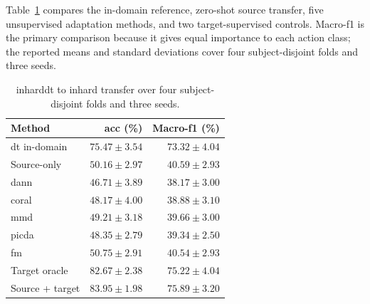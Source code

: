 \documentclass[3p,times,procedia]{elsarticle}
\begin{document}
Table~\ref{tab:main} compares the in-domain reference, zero-shot source
transfer, five unsupervised adaptation methods, and two target-supervised
controls. Macro-\acs{f1} is the primary comparison because it gives equal
importance to each action class; the reported means and standard deviations
cover four subject-disjoint folds and three seeds.

\begin{table}[H]
  \centering
  \caption{\acs{inharddt} to \acs{inhard} transfer over four subject-disjoint folds and three seeds.}
  \label{tab:main}
  \small
  \begin{tabular}{lrr}
    \toprule
    Method             & \acs{acc} (\%)          & Macro-\acs{f1} (\%)     \\
    \midrule
    \acs{dt} in-domain & $75.47\pm3.54$          & $73.32\pm4.04$          \\
    Source-only        & $50.16\pm2.97$          & $\mathbf{40.59\pm2.93}$ \\
    \acs{dann}         & $46.71\pm3.89$          & $38.17\pm3.00$          \\
    \acs{coral}        & $48.17\pm4.00$          & $38.88\pm3.10$          \\
    \acs{mmd}          & $49.21\pm3.18$          & $39.66\pm3.00$          \\
    \acs{picda}        & $48.35\pm2.79$          & $39.34\pm2.50$          \\
    \acs{fm}           & $50.75\pm2.91$          & $40.54\pm2.93$          \\
    Target oracle      & $82.67\pm2.38$          & $75.22\pm4.04$          \\
    Source + target    & $\mathbf{83.95\pm1.98}$ & $\mathbf{75.89\pm3.20}$ \\
    \bottomrule
  \end{tabular}
\end{table}
\end{document}
